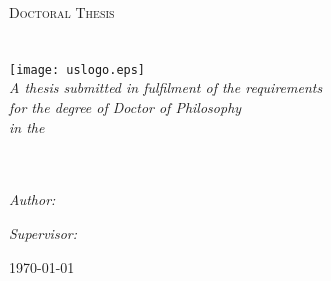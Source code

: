 \pagestyle{empty}
	\begin{center}

		\hrulefill\textsc{\Large Doctoral Thesis}\hrulefill\\%

		\Huge \textbf{\myTitle}\\ %
		\huge \textit{\mySubtitle} \\[3cm]%
		
		\texttt{[image: uslogo.eps]}\\[2cm]%
		\large \textit{A thesis submitted in fulfilment of the requirements\\ for the degree of Doctor of Philosophy}\\[0.5cm] %
		\textit{in the}\\[0.5cm]
		\myDepartment\\ \myFaculty\\[1cm]
	
		\begin{minipage}{.45\linewidth}
			\begin{flushleft} %
			\emph{Author:}\\
			\href{https://www.linkedin.com/in/mario-grandi}{\myName} %
			\end{flushleft}
		\end{minipage}
		\hfill
		\begin{minipage}{.45\linewidth}
			\begin{flushright} %
			\emph{Supervisor:} \\
			\mySupervisor %
			\end{flushright}
		\end{minipage}

		\vfill
		\large \today
		 
	\end{center}
